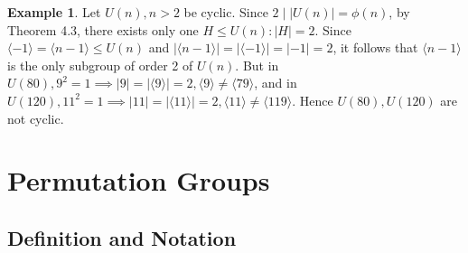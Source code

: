 \documentclass{article}
\theoremstyle{definition}
\newtheorem{definition}{Definition}[section]
\newtheorem{example}{Example}[section]
\begin{document}
\begin{example}
    Let $U(n), n>2$ be cyclic. Since $2 \mid |U(n)| = \phi(n)$, by Theorem 4.3, there exists only one $H \leq U(n): |H| = 2$. Since $\langle -1 \rangle = \langle n-1 \rangle \leq U(n)$ and $|\langle n-1 \rangle| = |\langle -1 \rangle| = |-1| = 2$, it follows that $\langle n-1 \rangle$ is the only subgroup of order 2 of $U(n)$. But in $U(80), 9^2 = 1 \implies |9|=|\langle 9 \rangle| = 2, \langle 9 \rangle \neq \langle 79 \rangle$, and in $U(120), 11^2 = 1 \implies |11|=|\langle 11 \rangle| = 2, \langle 11 \rangle \neq \langle 119 \rangle$. Hence $U(80),U(120)$ are not cyclic. 
\end{example}

\section{Permutation Groups}
\subsection{Definition and Notation}
\end{document}

